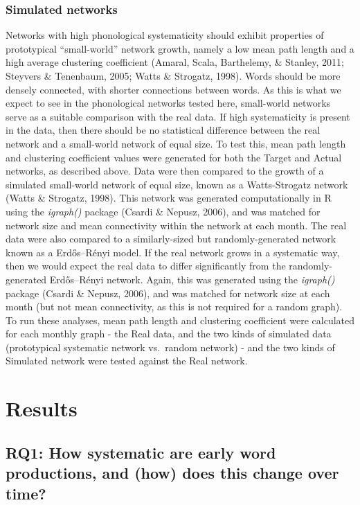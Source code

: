 \documentclass[
  man]{apa6}
\begin{document}
\hypertarget{simulated-networks}{%
\subsubsection{Simulated networks}\label{simulated-networks}}

Networks with high phonological systematicity should exhibit properties of prototypical ``small-world'' network growth, namely a low mean path length and a high average clustering coefficient (Amaral, Scala, Barthelemy, \& Stanley, 2011; Steyvers \& Tenenbaum, 2005; Watts \& Strogatz, 1998). Words should be more densely connected, with shorter connections between words. As this is what we expect to see in the phonological networks tested here, small-world networks serve as a suitable comparison with the real data. If high systematicity is present in the data, then there should be no statistical difference between the real network and a small-world network of equal size. To test this, mean path length and clustering coefficient values were generated for both the Target and Actual networks, as described above. Data were then compared to the growth of a simulated small-world network of equal size, known as a Watts-Strogatz network (Watts \& Strogatz, 1998). This network was generated computationally in R using the \emph{igraph()} package (Csardi \& Nepusz, 2006), and was matched for network size and mean connectivity within the network at each month. The real data were also compared to a similarly-sized but randomly-generated network known as a Erdős--Rényi model. If the real network grows in a systematic way, then we would expect the real data to differ significantly from the randomly-generated Erdős--Rényi network. Again, this was generated using the \emph{igraph()} package (Csardi \& Nepusz, 2006), and was matched for network size at each month (but not mean connectivity, as this is not required for a random graph). To run these analyses, mean path length and clustering coefficient were calculated for each monthly graph - the Real data, and the two kinds of simulated data (prototypical systematic network vs.~random network) - and the two kinds of Simulated network were tested against the Real network.

\hypertarget{results}{%
\section{Results}\label{results}}

\hypertarget{rq1-how-systematic-are-early-word-productions-and-how-does-this-change-over-time}{%
\subsection{RQ1: How systematic are early word productions, and (how) does this change over time?}\label{rq1-how-systematic-are-early-word-productions-and-how-does-this-change-over-time}}
\end{document}
